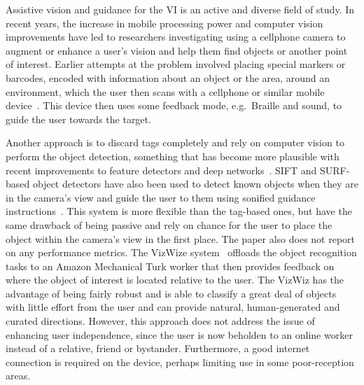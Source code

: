 \documentclass[a4paper, twoside]{article}
\begin{document}
\noindent Assistive vision and guidance for the VI is an active and diverse field of study. In recent years, the increase in mobile processing power and computer vision improvements have led to researchers investigating using a cellphone camera to augment or enhance a user's vision and help them find objects or another point of interest. Earlier attempts at the problem involved placing special markers or barcodes, encoded with information about an object or the area, around an environment, which the user then scans with a cellphone or similar mobile device~\cite{gude2013blind,iannizzotto2005badge3d,manduchi2012mobile}. This device then uses some feedback mode, e.g.\ Braille and sound, to guide the user towards the target. %

Another approach is to discard tags completely and rely on computer vision to perform the object detection, something that has become more plausible with recent improvements to feature detectors and deep networks~\cite{huang2017speed,redmon2016you}. SIFT and SURF-based object detectors have also been used to detect known objects when they are in the camera's view and guide the user to them using sonified guidance instructions~\cite{schauerte2012assistive}. This system is more flexible than the tag-based ones, but have the same drawback of being passive and rely on chance for the user to place the object within the camera's view in the first place. The paper also does not report on any performance metrics. The VizWize system~\cite{bigham2010vizwiz} offloads the object recognition tasks to an Amazon Mechanical Turk worker that then provides feedback on where the object of interest is located relative to the user. The VizWiz has the advantage of being fairly robust and is able to classify a great deal of objects with little effort from the user and can provide natural, human-generated and curated directions. However, this approach does not address the issue of enhancing user independence, since the user is now beholden to an online worker instead of a relative, friend or bystander. Furthermore, a good internet connection is required on the device, perhaps limiting use in some poor-reception areas.
\end{document}

